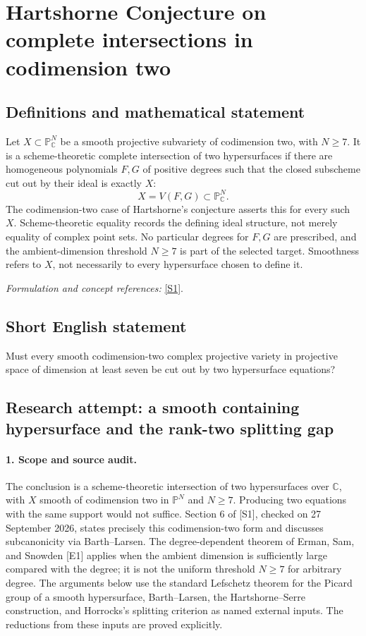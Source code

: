 \documentclass[11pt]{article}
\begin{document}
\section*{\texorpdfstring{Hartshorne Conjecture on complete intersections in codimension two}{Hartshorne Conjecture on complete intersections in codimension two}}\label{statement}
\subsection{Definitions and mathematical statement}
Let $X\subset{\mathbb{P}}^N_{{\mathbb{C}}}$ be a smooth projective subvariety of codimension two, with $N\ge7$. It is a scheme-theoretic complete intersection of two hypersurfaces if there are homogeneous polynomials $F,G$ of positive degrees such that the closed subscheme cut out by their ideal is exactly $X$:
\[
 X=V(F,G)\subset{\mathbb{P}}^N_{{\mathbb{C}}}.
\]
The codimension-two case of Hartshorne's conjecture asserts this for every such $X$. Scheme-theoretic equality records the defining ideal structure, not merely equality of complex point sets. No particular degrees for $F,G$ are prescribed, and the ambient-dimension threshold $N\ge7$ is part of the selected target. Smoothness refers to $X$, not necessarily to every hypersurface chosen to define it.
\par\smallskip\textit{Formulation and concept references:} \href{https://link.springer.com/article/10.1007/s12215-024-01032-4}{[S1]}.

\subsection{Short English statement}
Must every smooth codimension-two complex projective variety in projective space of dimension at least seven be cut out by two hypersurface equations?
\subsection{Research attempt: a smooth containing hypersurface and the rank-two splitting gap}
\paragraph{1. Scope and source audit.}
The conclusion is a scheme-theoretic intersection of two hypersurfaces over $\mathbb C$, with $X$ smooth of codimension two in $\mathbb P^N$ and $N\geq7$. Producing two equations with the same support would not suffice. Section 6 of [S1], checked on 27 September 2026, states precisely this codimension-two form and discusses subcanonicity via Barth--Larsen. The degree-dependent theorem of Erman, Sam, and Snowden [E1] applies when the ambient dimension is sufficiently large compared with the degree; it is not the uniform threshold $N\geq7$ for arbitrary degree. The arguments below use the standard Lefschetz theorem for the Picard group of a smooth hypersurface, Barth--Larsen, the Hartshorne--Serre construction, and Horrocks's splitting criterion as named external inputs. The reductions from these inputs are proved explicitly.
\end{document}
